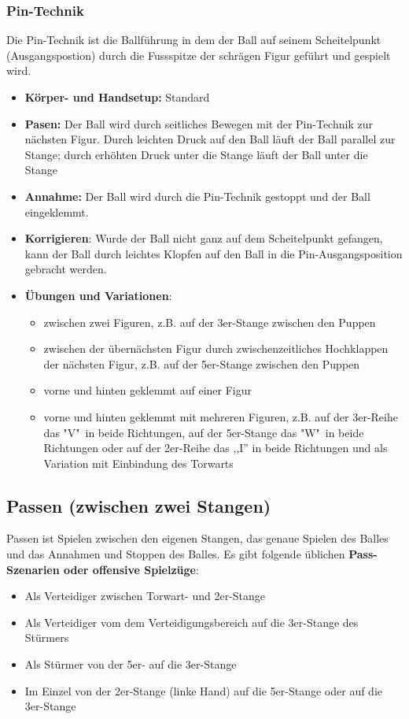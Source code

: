 \subsubsection{Pin-Technik}
Die Pin-Technik ist die Ballführung in dem der Ball auf seinem Scheitelpunkt (Ausgangspostion) durch die Fussspitze der schrägen Figur geführt und gespielt wird.
\begin{itemize}
    \item \textbf{Körper- und Handsetup:} Standard 
    \item \textbf{Pasen:} Der Ball wird durch seitliches Bewegen mit der Pin-Technik zur nächsten Figur. Durch leichten Druck auf den Ball läuft der Ball parallel zur Stange; durch erhöhten Druck unter die Stange läuft der Ball unter die Stange
    \item \textbf{Annahme:} Der Ball wird durch die Pin-Technik gestoppt und der Ball eingeklemmt.
    \item \textbf{Korrigieren}: Wurde der Ball nicht ganz auf dem Scheitelpunkt gefangen, kann der Ball durch leichtes Klopfen auf den Ball in die Pin-Ausgangsposition gebracht werden.
    \item \textbf{Übungen und Variationen}:
        \begin{itemize}
            \item zwischen zwei Figuren, z.B. auf der 3er-Stange zwischen den Puppen
            \item zwischen der übernächsten Figur durch zwischenzeitliches Hochklappen der nächsten Figur, z.B. auf der 5er-Stange zwischen den Puppen
            \item vorne und hinten geklemmt auf einer Figur
            \item vorne und hinten geklemmt mit mehreren Figuren, z.B. auf der 3er-Reihe das "V"\  in beide Richtungen, auf der 5er-Stange das "W"\ in beide Richtungen oder auf der 2er-Reihe das ,,I'' in beide Richtungen und als Variation mit Einbindung des Torwarts
        \end{itemize}
\end{itemize}

\subsection{Passen (zwischen zwei Stangen)}
\label{technik:offensive:zwei}

Passen ist Spielen zwischen den eigenen Stangen, das genaue Spielen des Balles und das Annahmen und Stoppen des Balles.
Es gibt folgende üblichen \textbf{Pass-Szenarien oder offensive Spielzüge}:
\begin{itemize}
    \item Als Verteidiger zwischen Torwart- und 2er-Stange
    \item Als Verteidiger vom dem Verteidigungsbereich auf die 3er-Stange des Stürmers
    \item Als Stürmer von der 5er- auf die 3er-Stange
    \item Im Einzel von der 2er-Stange (linke Hand) auf die 5er-Stange oder auf die 3er-Stange
\end{itemize}

